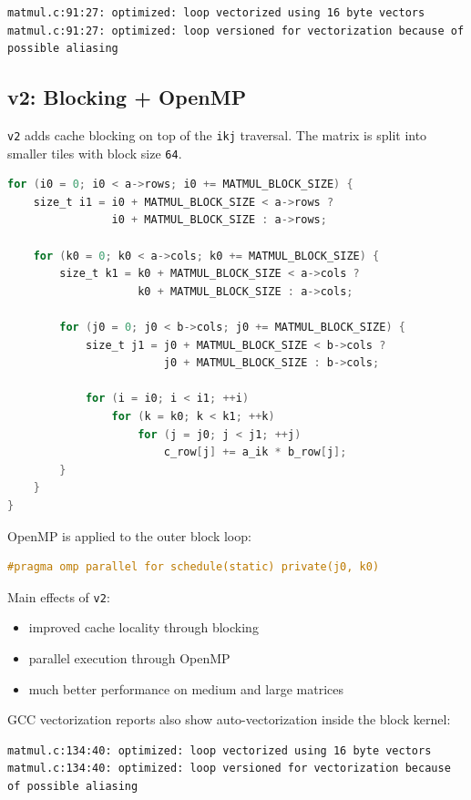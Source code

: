 \documentclass[11pt,a4paper]{article}
\begin{document}
\begin{lstlisting}
matmul.c:91:27: optimized: loop vectorized using 16 byte vectors
matmul.c:91:27: optimized: loop versioned for vectorization because of possible aliasing
\end{lstlisting}

\subsection{v2: Blocking + OpenMP}
\texttt{v2} adds cache blocking on top of the \texttt{ikj} traversal. The matrix is split into smaller tiles with block size \texttt{64}.

\begin{lstlisting}[language=C]
for (i0 = 0; i0 < a->rows; i0 += MATMUL_BLOCK_SIZE) {
    size_t i1 = i0 + MATMUL_BLOCK_SIZE < a->rows ?
                i0 + MATMUL_BLOCK_SIZE : a->rows;

    for (k0 = 0; k0 < a->cols; k0 += MATMUL_BLOCK_SIZE) {
        size_t k1 = k0 + MATMUL_BLOCK_SIZE < a->cols ?
                    k0 + MATMUL_BLOCK_SIZE : a->cols;

        for (j0 = 0; j0 < b->cols; j0 += MATMUL_BLOCK_SIZE) {
            size_t j1 = j0 + MATMUL_BLOCK_SIZE < b->cols ?
                        j0 + MATMUL_BLOCK_SIZE : b->cols;

            for (i = i0; i < i1; ++i)
                for (k = k0; k < k1; ++k)
                    for (j = j0; j < j1; ++j)
                        c_row[j] += a_ik * b_row[j];
        }
    }
}
\end{lstlisting}

OpenMP is applied to the outer block loop:

\begin{lstlisting}[language=C]
#pragma omp parallel for schedule(static) private(j0, k0)
\end{lstlisting}

Main effects of \texttt{v2}:
\begin{itemize}
    \item improved cache locality through blocking
    \item parallel execution through OpenMP
    \item much better performance on medium and large matrices
\end{itemize}

GCC vectorization reports also show auto-vectorization inside the block kernel:

\begin{lstlisting}
matmul.c:134:40: optimized: loop vectorized using 16 byte vectors
matmul.c:134:40: optimized: loop versioned for vectorization because of possible aliasing
\end{lstlisting}
\end{document}
